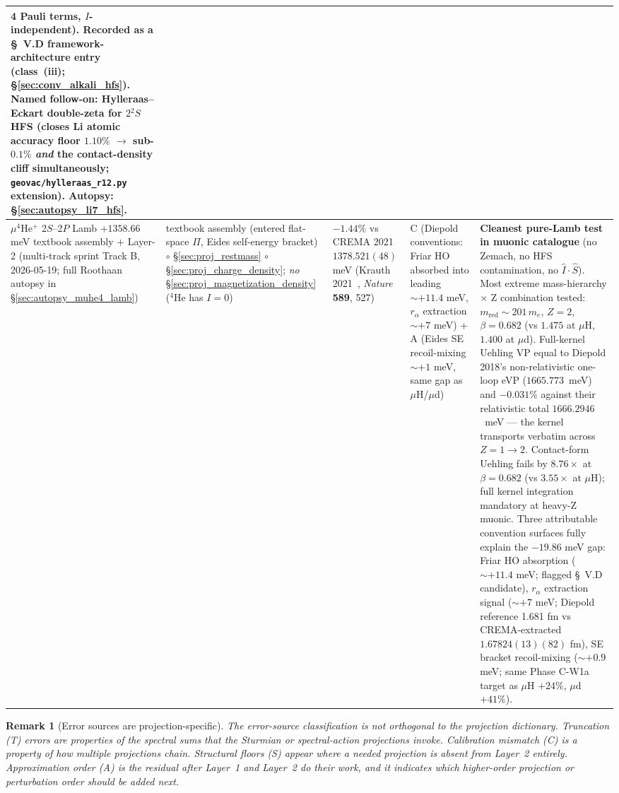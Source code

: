 \documentclass[11pt]{article}
\newtheorem{remark}{Remark}
\begin{document}
{\begin{longtable}{p{3.8cm} p{2.5cm} p{1.5cm} p{1.4cm} p{4.5cm}}
4 Pauli terms, $I$-independent).  Recorded as a \S~V.D
framework-architecture entry (class~(iii); \S\ref{sec:conv_alkali_hfs}).
\textbf{Named follow-on}: Hylleraas--Eckart double-zeta for $2{}^2S$
HFS (closes Li atomic accuracy floor $1.10\%$ $\to$ sub-$0.1\%$
\emph{and} the contact-density cliff simultaneously;
\texttt{geovac/hylleraas\_r12.py} extension).  Autopsy:
\S\ref{sec:autopsy_li7_hfs}. \\
\midrule
$\mu^4$He$^+$ 2$S$--2$P$ Lamb $+1358.66$ meV textbook assembly $+$ Layer-2
(multi-track sprint Track B, 2026-05-19; full Roothaan autopsy in
\S\ref{sec:autopsy_muhe4_lamb}) &
textbook assembly (entered flat-space $\Pi$, Eides self-energy
bracket) $\circ$ \S\ref{sec:proj_restmass}
$\circ$ \S\ref{sec:proj_charge_density}; \emph{no}
\S\ref{sec:proj_magnetization_density} ($^4$He has $I=0$) &
$-1.44\%$ vs CREMA 2021 $1378.521(48)$ meV (Krauth 2021~\cite{krauth2021},
\emph{Nature} \textbf{589}, 527) &
C (Diepold conventions: Friar HO absorbed into leading
$\sim +11.4$ meV, $r_\alpha$ extraction $\sim +7$ meV) +
A (Eides SE recoil-mixing $\sim +1$ meV, same gap as $\mu$H/$\mu$d) &
\textbf{Cleanest pure-Lamb test in muonic catalogue} (no Zemach,
no HFS contamination, no $\hat{I}\cdot\hat{S}$).  Most extreme
mass-hierarchy $\times$ Z combination tested: $m_\text{red} \sim
201\,m_e$, $Z = 2$, $\beta = 0.682$ (vs $1.475$ at $\mu$H, $1.400$
at $\mu$d).  Full-kernel Uehling VP equal to Diepold 2018's
non-relativistic one-loop eVP ($1665.773$~meV) and $-0.031\%$ against
their relativistic total $1666.2946$~meV --- the kernel transports verbatim
across $Z = 1 \to 2$.  Contact-form Uehling fails by
$\mathbf{8.76\times}$ at $\beta = 0.682$ (vs $3.55\times$ at $\mu$H);
full kernel integration mandatory at heavy-Z muonic.  Three
attributable convention surfaces fully explain the $-19.86$ meV gap:
Friar HO absorption ($\sim +11.4$ meV; flagged \S~V.D candidate),
$r_\alpha$ extraction signal ($\sim +7$ meV; Diepold reference 1.681
fm vs CREMA-extracted $1.67824(13)(82)$ fm), SE bracket recoil-mixing
($\sim +0.9$ meV; same Phase C-W1a target as $\mu$H $+24\%$, $\mu$d
$+41\%$). \\
\bottomrule
\end{longtable}
}

\begin{remark}[Error sources are projection-specific]
\label{rem:err_sources}
The error-source classification is not orthogonal to the projection
dictionary.  Truncation (T) errors are properties of the spectral
sums that the Sturmian or spectral-action projections invoke.
Calibration mismatch (C) is a property of how multiple projections
chain.  Structural floors (S) appear where a needed projection is
absent from Layer~2 entirely.  Approximation order (A) is the residual after Layer~1 and
Layer~2 do their work, and it indicates which higher-order projection
or perturbation order should be added next.
\end{remark}
\end{document}

